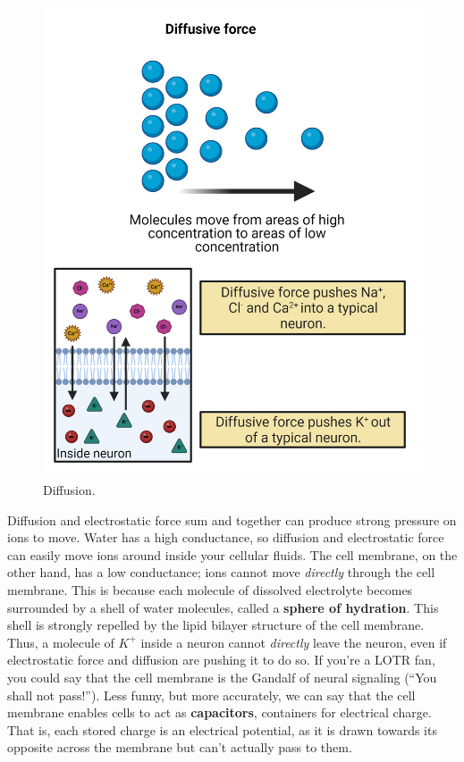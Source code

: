 \documentclass[
]{book}
\begin{document}
\begin{figure}

{\centering \includegraphics[width=0.9\linewidth]{images/ch02/02_15} 

}

\caption{Diffusion.}\label{fig:diffusion}
\end{figure}

Diffusion and electrostatic force sum and together can produce strong pressure on ions to move. Water has a high conductance, so diffusion and electrostatic force can easily move ions around inside your cellular fluids. The cell membrane, on the other hand, has a low conductance; ions cannot move \emph{directly} through the cell membrane. This is because each molecule of dissolved electrolyte becomes surrounded by a shell of water molecules, called a \textbf{sphere of hydration}. This shell is strongly repelled by the lipid bilayer structure of the cell membrane. Thus, a molecule of \(K^+\) inside a neuron cannot \emph{directly} leave the neuron, even if electrostatic force and diffusion are pushing it to do so. If you're a LOTR fan, you could say that the cell membrane is the Gandalf of neural signaling (``You shall not pass!''). Less funny, but more accurately, we can say that the cell membrane enables cells to act as \textbf{capacitors}, containers for electrical charge. That is, each stored charge is an electrical potential, as it is drawn towards its opposite across the membrane but can't actually pass to them.
\end{document}
